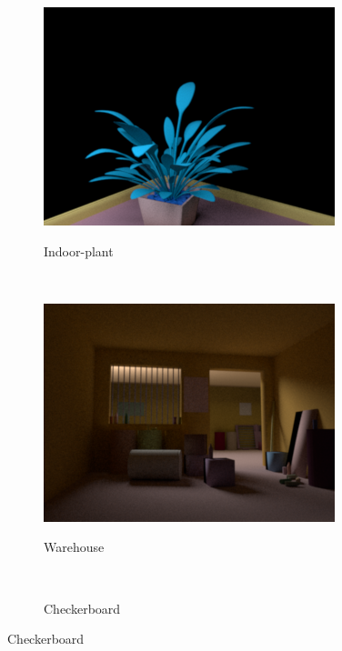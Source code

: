 \documentclass{jov}
\begin{document}
\begin{figure}[t]
    \begin{subfigure}[b]{0.22 \textwidth}
        \caption{Indoor-plant}    
        \includegraphics[width=\textwidth]{../Figures/Figure3/Figure3_d.png}
        \label{fig:baseSceneIndoorPlant}
    \end{subfigure}    
    ~
    \begin{subfigure}[b]{0.22 \textwidth}
        \caption{Warehouse}    
        \includegraphics[width=\textwidth]{../Figures/Figure3/Figure3_e.png}
        \label{fig:baseSceneWarehouse}
    \end{subfigure}
    ~
    \begin{subfigure}[b]{0.22 \textwidth}
        \caption{Checkerboard}    

\end{subfigure}
\end{figure}
\end{document}
